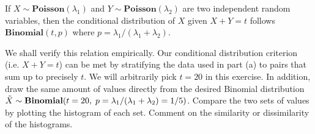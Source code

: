 \documentclass[11pt]{article}
\begin{document}
\item {} If $X \sim \textbf{Poisson} (\lambda_1)$ and $Y \sim \textbf{Poisson} (\lambda_2)$ are two independent random variables, then the conditional distribution of $X$ given $X + Y = t$ follows $\textbf{Binomial}(t, p)$ where $p = \lambda_1 / (\lambda_1 + \lambda_2)$. 

We shall verify this relation empirically. Our conditional distribution criterion (i.e. $X + Y = t$) can be met by stratifying the data used in part (a) to pairs that sum up to precisely $t$. We will arbitrarily pick $t = 20$ in this exercise. In addition, draw the same amount of values directly from the desired Binomial distribution $\Tilde{X} \sim \textbf{Binomial}(t = 20, \; p = \lambda_1 / (\lambda_1 + \lambda_2) = 1/5)$. Compare the two sets of values by plotting the histogram of each set. Comment on the similarity or dissimilarity of the histograms.



\ee
\end{document}
